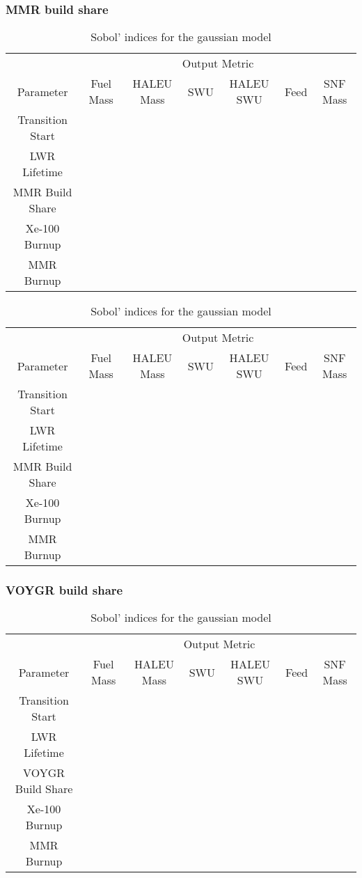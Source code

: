 \subsubsection{MMR build share}
\begin{table}
    \centering
    \caption{Sobol' indices for the gaussian model}
    \label{tab:s7_sobol_mmr_gaussian}
    \begin{tabular}{c c c c c c c}
        \hline
        & \multicolumn{6}{c}{Output Metric} \\
        Parameter & Fuel Mass & HALEU Mass & SWU & HALEU SWU & Feed & SNF Mass \\
        \hline
        Transition Start & \\
        LWR Lifetime & \\
        MMR Build Share & \\
        Xe-100 Burnup & \\
        MMR Burnup & \\
        \hline        
    \end{tabular}
\end{table}

\begin{table}
    \centering
    \caption{Sobol' indices for the gaussian model}
    \label{tab:s7_sobol_mmr_quadratic}
    \begin{tabular}{c c c c c c c}
        \hline
        & \multicolumn{6}{c}{Output Metric} \\
        Parameter & Fuel Mass & HALEU Mass & SWU & HALEU SWU & Feed & SNF Mass \\
        \hline
        Transition Start & \\
        LWR Lifetime & \\
        MMR Build Share & \\
        Xe-100 Burnup & \\
        MMR Burnup & \\
        \hline        
    \end{tabular}
\end{table}

\subsubsection{VOYGR build share}
\begin{table}
    \centering
    \caption{Sobol' indices for the gaussian model}
    \label{tab:s7_sobol_voygr_gaussian}
    \begin{tabular}{c c c c c c c}
        \hline
        & \multicolumn{6}{c}{Output Metric} \\
        Parameter & Fuel Mass & HALEU Mass & SWU & HALEU SWU & Feed & SNF Mass \\
        \hline
        Transition Start & \\
        LWR Lifetime & \\
        VOYGR Build Share & \\
        Xe-100 Burnup & \\
        MMR Burnup & \\
        \hline        
    \end{tabular}
\end{table}

